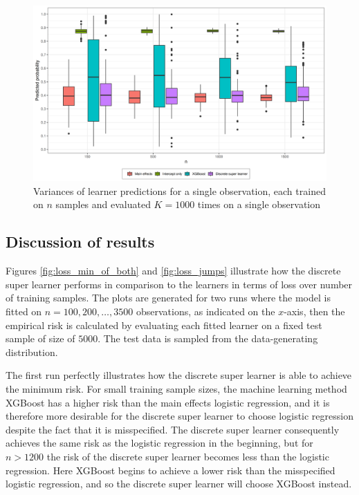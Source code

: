 \documentclass[11pt, a4paper]{article}
\theoremstyle{definition}
\theoremstyle{remark}
\begin{document}
\begin{figure}[H]
    \centering
    \includegraphics[width=\textwidth]{figures/learner_vars.png}
    \caption{Variances of learner predictions for a single observation, each trained on $n $ samples and evaluated $ K = 1000 $ times on a single observation}
    \label{fig:pred_probs_boxplot}
\end{figure}

\subsection{Discussion of results}
Figures \ref{fig:loss_min_of_both} and \ref{fig:loss_jumps} illustrate how the discrete super learner performs in comparison to the learners in terms of loss over number of training samples. The plots are generated for two runs where the model is fitted on $ n = 100, 200, \dots , 3500 $ observations, as indicated on the $ x $-axis, then the empirical risk is calculated by evaluating each fitted learner on a fixed test sample of size of $ 5000 $. The test data is sampled from the data-generating distribution.  

The first run perfectly illustrates how the discrete super learner is able to achieve the minimum risk. For small training sample sizes, the machine learning method XGBoost has a higher risk than the main effects logistic regression, and it is therefore more desirable for the discrete super learner to choose logistic regression despite the fact that it is misspecified. The discrete super learner consequently achieves the same risk as the logistic regression in the beginning, but for $ n > 1200 $ the risk of the discrete super learner becomes less than the logistic regression. Here XGBoost begins to achieve a lower risk than the misspecified logistic regression, and so the discrete super learner will choose XGBoost instead. 
\end{document}
